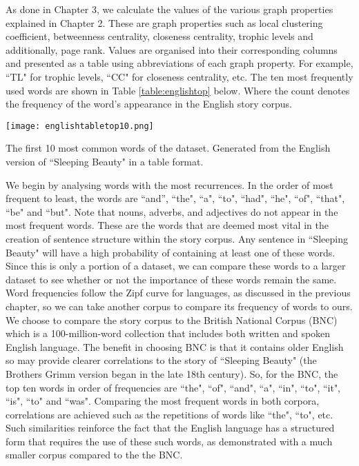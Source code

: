 As done in Chapter 3, we calculate the values of the various graph properties explained in Chapter 2. These are graph properties such as local clustering coefficient, betweenness centrality, closeness centrality, trophic levels and additionally, page rank. Values are organised into their corresponding columns and presented as a table using abbreviations of each graph property. For example, ``TL" for trophic levels, ``CC" for closeness centrality, etc. The ten most frequently used words are shown in Table \ref{table:englishtop} below. Where the count denotes the frequency of the word's appearance in the English story corpus. 

\begin{table}[!htb]
\centering
\texttt{[image: englishtabletop10.png]}
\caption{The first 10 most common words of the dataset. Generated from the English version of ``Sleeping Beauty" in a table format.}
\label{table:englishtop}
\end{table}

We begin by analysing words with the most recurrences. In the order of most frequent to least, the words are ``and'', ``the", ``a", ``to", ``had", ``he", ``of", ``that", ``be" and ``but". Note that nouns, adverbs, and adjectives do not appear in the most frequent words. These are the words that are deemed most vital in the creation of sentence structure within the story corpus. Any sentence in ``Sleeping Beauty" will have a high probability of containing at least one of these words. Since this is only a portion of a dataset, we can compare these words to a larger dataset to see whether or not the importance of these words remain the same. Word frequencies follow the Zipf curve for languages, as discussed in the previous chapter, so we can take another corpus to compare its frequency of words to ours. We choose to compare the story corpus to the British National Corpus (BNC) \cite{bnc2007british} which is a 100-million-word collection that includes both written and spoken English language. The benefit in choosing BNC is that it contains older English so may provide clearer correlations to the story of ``Sleeping Beauty" (the Brothers Grimm version began in the late 18th century). So, for the BNC, the top ten words \cite{leech2014word} in order of frequencies are ``the", ``of", ``and", ``a", ``in", ``to", ``it", ``is", ``to" and ``was". Comparing the most frequent words in both corpora, correlations are achieved such as the repetitions of words like ``the", ``to", etc. Such similarities reinforce the fact that the English language has a structured form that requires the use of these such words, as demonstrated with a much smaller corpus compared to the the BNC.

